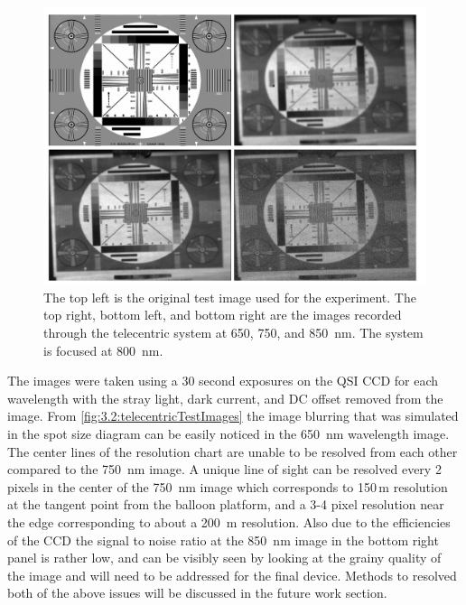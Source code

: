 \begin{figure}
    \begin{center}
    \includegraphics[width=1.0\textwidth]{./Images/3-2-TelecentricTestImages.pdf}
    \caption[Telecentric Prototype Laboratory Test Images]{The top left is the original test image used for the experiment. The top right, bottom left, and bottom right are the images recorded through the telecentric system at 650, 750, and 850~nm. The system is focused at 800~nm.}
    \label{fig:3.2:telecentricTestImages}
    \end{center}
\end{figure}

The images were taken using a 30 second exposures on the QSI CCD for each wavelength with the stray light, dark current, and DC offset removed from the image. From \autoref{fig:3.2:telecentricTestImages} the image blurring that was simulated in the spot size diagram can be easily noticed in the 650~nm wavelength image. The center lines of the resolution chart are unable to be resolved from each other compared to the 750~nm image. A unique line of sight can be resolved every 2 pixels in the center of the 750~nm image which corresponds to 150\,m resolution at the tangent point from the balloon platform, and a 3-4 pixel resolution near the edge corresponding to about a 200~m resolution. Also due to the efficiencies of the CCD the signal to noise ratio at the 850~nm image in the bottom right panel is rather low, and can be visibly seen by looking at the grainy quality of the image and will need to be addressed for the final device. Methods to resolved both of the above issues will be discussed in the future work section.

